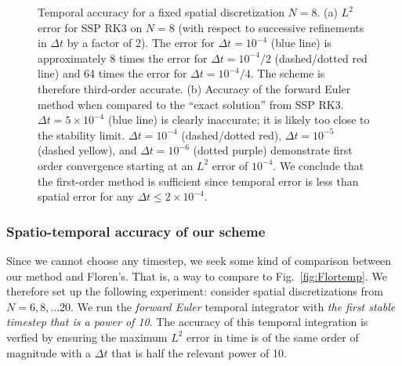 \begin{figure}
\centering 
{}
\caption{Temporal accuracy for a fixed spatial discretization $N=8$. (a) $L^2$ error for SSP RK3 on $N=8$ (with respect to successive refinements in $\Delta t$ by a factor of 2). The error for $\Delta t =10^{-4}$ (blue line) is approximately 8 times the error for $\Delta t = 10^{-4}/2$ (dashed/dotted red line) and 64 times the error for $\Delta t =10^{-4}/4$. The scheme is therefore third-order accurate. (b) Accuracy of the forward Euler method when compared to the ``exact solution'' from SSP RK3. $\Delta t = 5 \times 10^{-4}$ (blue line) is clearly inaccurate; it is likely too close to the stability limit. $\Delta t=10^{-4}$ (dashed/dotted red), $\Delta t =10^{-5}$ (dashed yellow), and $\Delta t =10^{-6}$ (dotted purple) demonstrate first order convergence starting at an $L^2$ error of $10^{-4}$. We conclude that the first-order method is sufficient since temporal error is less than spatial error for any $\Delta t \leq 2 \times 10^{-4}$.} 
\end{figure}

\subsubsection{Spatio-temporal accuracy of our scheme}
Since we cannot choose any timestep, we seek some kind of comparison between our method and Floren's. That is, a way to compare to Fig.\ \ref{fig:Flortemp}. We therefore set up the following experiment: consider spatial discretizations from $N=6, 8, \dots 20$. We run the \textit{forward Euler} temporal integrator with \textit{the first stable timestep that is a power of 10}. The accuracy of this temporal integration is verfied by ensuring the maximum $L^2$ error in time is of the same order of magnitude with a $\Delta t$ that is half the relevant power of 10. 

